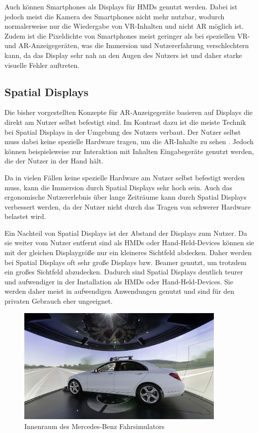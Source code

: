   Auch können Smartphones als Displays für HMDs genutzt werden.
  Dabei ist jedoch meist die Kamera des Smartphones nicht mehr nutzbar, wodurch normalerweise nur die Wiedergabe von VR-Inhalten und nicht AR möglich ist.
  Zudem ist die Pixeldichte von Smartphones meist geringer als bei speziellen VR- und AR-Anzeigegeräten, was die Immersion und Nutzererfahrung verschlechtern kann, da das Display sehr nah an den Augen des Nutzers ist und daher starke visuelle Fehler auftreten.

  

  \subsection{Spatial Displays}

  Die bisher vorgestellten Konzepte für AR-Anzeigegeräte basieren auf Displays die direkt am Nutzer selbst befestigt sind.
  Im Kontrast dazu ist die meiste Technik bei Spatial Displays in der Umgebung des Nutzers verbaut.
  Der Nutzer selbst muss dabei keine spezielle Hardware tragen, um die AR-Inhalte zu sehen \autocite[]{bimber2006modern}.
  Jedoch können beispielsweise zur Interaktion mit Inhalten Eingabegeräte genutzt werden, die der Nutzer in der Hand hält.

  Da in vielen Fällen keine spezielle Hardware am Nutzer selbst befestigt werden muss, kann die Immersion durch Spatial Displays sehr hoch sein.
  Auch das ergonomische Nutzererlebnis über lange Zeiträume kann durch Spatial Displays verbessert werden, da der Nutzer nicht durch das Tragen von schwerer Hardware belastet wird.

  Ein Nachteil von Spatial Displays ist der Abstand der Displays zum Nutzer.
  Da sie weiter vom Nutzer entfernt sind als HMDs oder Hand-Held-Devices können sie mit der gleichen Displaygröße nur ein kleineres Sichtfeld abdecken.
  Daher werden bei Spatial Displays oft sehr große Displays bzw. Beamer genutzt, um trotzdem ein großes Sichtfeld abzudecken.
  Dadurch sind Spatial Displays deutlich teurer und aufwendiger in der Installation als HMDs oder Hand-Held-Devices.
  Sie werden daher meist in aufwendigen Anwendungen genutzt und sind für den privaten Gebrauch eher ungeeignet.

  \begin{figure}[H]
    \centering
    \includegraphics[width=0.9\textwidth]{images/merc-sim.png}
    \caption{Innenraum des Mercedes-Benz Fahrsimulators}
    \label{fig:merc-sim}
  \end{figure}

